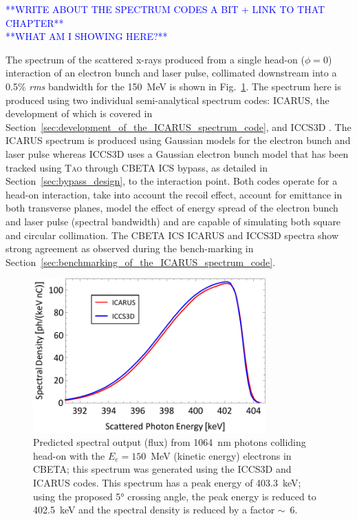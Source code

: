 \documentclass[../main.tex]{subfiles}
\begin{document}
\textcolor{blue}{**WRITE ABOUT THE SPECTRUM CODES A BIT + LINK TO THAT CHAPTER** \\ **WHAT AM I SHOWING HERE?**}

The spectrum of the scattered x-rays produced from a single head-on ($\phi = 0$) interaction of an electron bunch and laser pulse, collimated downstream into a 0.5\% \textit{rms} bandwidth for the 150~\si{\mega\electronvolt} is shown in Fig.~\ref{fig:CBETA_spectrum_benchmarking}. The spectrum here is produced using two individual semi-analytical spectrum codes: \textsc{ICARUS}, the development of which is covered in Section~\ref{sec:development_of_the_ICARUS_spectrum_code}, and \textsc{ICCS3D} \cite{krafft2016laser,ranjan2018simulation}. The \textsc{ICARUS} spectrum is produced using Gaussian models for the electron bunch and laser pulse whereas \textsc{ICCS3D} uses a Gaussian electron bunch model that has been tracked using \textsc{Tao} through CBETA ICS bypass, as detailed in Section~\ref{sec:bypass_design}, to the interaction point. Both codes operate for a head-on interaction, take into account the recoil effect, account for emittance in both transverse planes, model the effect of energy spread of the electron bunch and laser pulse (spectral bandwidth) and are capable of simulating both square and circular collimation. The CBETA ICS \textsc{ICARUS} and \textsc{ICCS3D} spectra show strong agreement as observed during the bench-marking in Section~\ref{sec:benchmarking_of_the_ICARUS_spectrum_code}.

\begin{figure}[!h]
\centering
\includegraphics[width=0.8\textwidth]{Figures/CBETA_Inverse_Compton_Source_Design/cbetaspectrumplot_final.pdf}
\caption{Predicted spectral output (flux) from 1064~\si{\nano\meter} photons colliding head-on with the $E_e =150$~\si{\mega\electronvolt} (kinetic energy) electrons in CBETA; this spectrum was generated using the \textsc{ICCS3D} and \textsc{ICARUS} codes. This spectrum has a peak energy of 403.3~\si{\kilo\electronvolt}; using the proposed 5\si{\degree} crossing angle, the peak energy is reduced to 402.5~\si{\kilo\electronvolt} and the spectral density is reduced by a factor $\sim$~6.}
\label{fig:CBETA_spectrum_benchmarking}
\end{figure}
\end{document}
